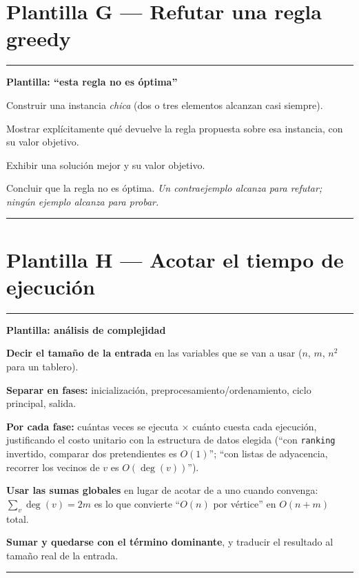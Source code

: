 \documentclass[11pt,a4paper]{article}
\theoremstyle{plain}
\theoremstyle{definition}
\theoremstyle{remark}
\newenvironment{plantilla}[1]{\par\medskip\noindent
  \begin{minipage}{\textwidth}\hrule\vspace{3pt}
  \noindent\textbf{Plantilla: #1}\par\smallskip}
  {\vspace{2pt}\hrule\end{minipage}\par\medskip}
\begin{document}
\section{Plantilla G --- Refutar una regla greedy}

\begin{plantilla}{``esta regla no es óptima''}
\begin{pasos}
\item Construir una instancia \emph{chica} (dos o tres elementos alcanzan casi siempre).
\item Mostrar explícitamente qué devuelve la regla propuesta sobre esa instancia, con su
valor objetivo.
\item Exhibir una solución mejor y su valor objetivo.
\item Concluir que la regla no es óptima. \emph{Un contraejemplo alcanza para refutar;
ningún ejemplo alcanza para probar.}
\end{pasos}
\end{plantilla}

\section{Plantilla H --- Acotar el tiempo de ejecución}

\begin{plantilla}{análisis de complejidad}
\begin{pasos}
\item \textbf{Decir el tamaño de la entrada} en las variables que se van a usar ($n$,
$m$, $n^2$ para un tablero).
\item \textbf{Separar en fases:} inicialización, preprocesamiento/ordenamiento, ciclo
principal, salida.
\item \textbf{Por cada fase:} cuántas veces se ejecuta $\times$ cuánto cuesta cada
ejecución, justificando el costo unitario con la estructura de datos elegida
(``con \texttt{ranking} invertido, comparar dos pretendientes es $O(1)$''; ``con listas
de adyacencia, recorrer los vecinos de $v$ es $O(\deg(v))$'').
\item \textbf{Usar las sumas globales} en lugar de acotar de a uno cuando convenga:
$\sum_v \deg(v)=2m$ es lo que convierte ``$O(n)$ por vértice'' en $O(n+m)$ total.
\item \textbf{Sumar y quedarse con el término dominante}, y traducir el resultado al
tamaño real de la entrada.
\end{pasos}
\end{plantilla}
\end{document}
